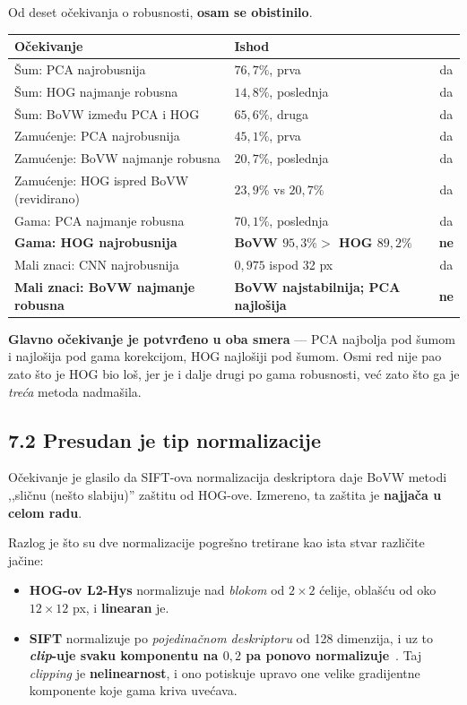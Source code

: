 \documentclass[11pt,a4paper]{article}
\begin{document}
Od deset očekivanja o robusnosti, \textbf{osam se obistinilo}.

\begin{center}
\begin{tabular}{>{\raggedright\arraybackslash}p{10.5cm}>{\raggedright\arraybackslash}p{4.6cm}c}
\toprule
\textbf{Očekivanje} & \textbf{Ishod} & \\
\midrule
Šum: PCA najrobusnija & $76{,}7\%$, prva & da \\
Šum: HOG najmanje robusna & $14{,}8\%$, poslednja & da \\
Šum: BoVW između PCA i HOG & $65{,}6\%$, druga & da \\
Zamućenje: PCA najrobusnija & $45{,}1\%$, prva & da \\
Zamućenje: BoVW najmanje robusna & $20{,}7\%$, poslednja & da \\
Zamućenje: HOG ispred BoVW (revidirano) & $23{,}9\%$ vs $20{,}7\%$ & da \\
Gama: PCA najmanje robusna & $70{,}1\%$, poslednja & da \\
\textbf{Gama: HOG najrobusnija} & \textbf{BoVW $95{,}3\% >$ HOG $89{,}2\%$} & \textbf{ne} \\
Mali znaci: CNN najrobusnija & $0{,}975$ ispod 32 px & da \\
\textbf{Mali znaci: BoVW najmanje robusna} & \textbf{BoVW najstabilnija; PCA najlošija} & \textbf{ne} \\
\bottomrule
\end{tabular}
\end{center}

\textbf{Glavno očekivanje je potvrđeno u oba smera} — PCA najbolja pod šumom i najlošija pod
gama korekcijom, HOG najlošiji pod šumom. Osmi red nije pao zato što je HOG bio loš, jer je i
dalje drugi po gama robusnosti, već zato što ga je \emph{treća} metoda nadmašila.

\subsection*{7.2 Presudan je tip normalizacije}

Očekivanje je glasilo da SIFT-ova normalizacija deskriptora daje BoVW metodi ,,sličnu (nešto
slabiju)'' zaštitu od HOG-ove. Izmereno, ta zaštita je \textbf{najjača u celom radu}.

Razlog je što su dve normalizacije pogrešno tretirane kao ista stvar različite jačine:

\begin{itemize}
\item \textbf{HOG-ov L2-Hys} normalizuje nad \emph{blokom} od $2\times2$ ćelije, oblašću od
oko $12\times12$ px, i \textbf{linearan} je.
\item \textbf{SIFT} normalizuje po \emph{pojedinačnom deskriptoru} od 128 dimenzija, i uz to
\textbf{\textit{clip}-uje svaku komponentu na $0{,}2$ pa ponovo normalizuje}~\cite{sift}. Taj \textit{clipping} je
\textbf{nelinearnost}, i ono potiskuje upravo one velike gradijentne komponente koje gama kriva
uvećava.
\end{itemize}
\end{document}
